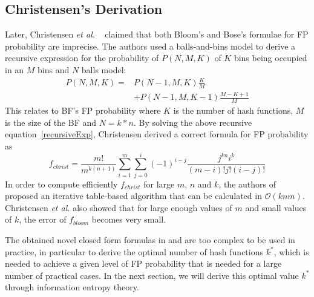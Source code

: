 \subsection{Christensen's Derivation}
Later, Christensen \textit{et al.} ~\cite{ken2010false} claimed that both Bloom's and Bose's formulae for FP probability are imprecise. The authors used a balls-and-bins model to derive a recursive expression for the probability of $P(N,M,K)$ of $K$ bins being occupied in an $M$ bins and $N$ balls model:
\begin{equation}
\label{recursiveExp}
\begin{aligned}
P(N,M,K) = & P(N-1,M,K)\frac{K}{M} \\
& +P(N-1,M,K-1)\frac{M-K+1}{M}
\end{aligned}
\end{equation}
This relates to BF's FP probability where $K$ is the number of hash functions, $M$ is the size of the BF and $N=k*n$. %
By solving the above recursive equation~\ref{recursiveExp}, Christensen derived a correct formula for FP probability as
\begin{equation}
\label{fChristen}
f_{christ}=\dfrac{m!}{m^{k(n+1)}}\sum\limits_{i=1}^{m} \sum\limits_{j=0}^{i} (-1)^{i-j}  \dfrac{j^{kn}i^k}{(m-i)!j!(i-j)!}
\end{equation}
In order to compute efficiently $f_{christ}$ for large $m$, $n$ and $k$, the authors of ~\cite{ken2010false} proposed an iterative table-based algorithm that can be calculated in $\mathcal{O}(knm)$. Christensen \textit{et al.} also showed that for large enough values of $m$ and small values of $k$, the error of $f_{bloom}$ becomes very small.

The obtained novel closed form formulas in \cite{bose2008false} and \cite{ken2010false} are too complex to be used in practice, in particular to derive the optimal number of hash functions $k^*$,
which is needed to achieve a given level of FP probability that is needed for a large number of practical cases.
In the next section, we will derive this optimal value $k^*$ through information entropy theory.